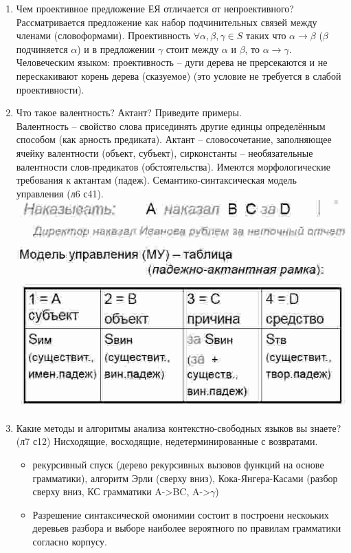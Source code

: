 \documentclass[a4paper]{article}
\begin{document}
\begin{enumerate}
	\item Чем проективное предложение ЕЯ отличается от непроективного?\hfill\\
	Рассматривается предложение как набор подчинительных связей между членами (словоформами). Проективность $\forall \alpha, \beta, \gamma \in S$ таких что $\alpha\to \beta$ ($\beta$ подчиняется $\alpha$) и в предложении $\gamma$ стоит между $\alpha$ и $\beta$, то $\alpha\to\gamma$. Человеческим языком: проективность -- дуги дерева не прерсекаются и не перескакивают корень дерева (сказуемое) (это условие не требуется в слабой проективности).

	\item Что такое валентность? Актант? Приведите примеры.\hfill\\
	Валентность -- свойство слова присединять другие единцы определённым способом (как арность предиката). Актант -- словосочетание, заполняющее ячейку валентности (объект, субъект), сирконстанты -- необязательные валентности слов-предикатов (обстоятельства). Имеются морфологические требования к актантам (падеж). Семантико-синтаксическая модель управления (л6 с41).\hfill\\
	\includegraphics[scale=0.5]{valency}

	\item Какие методы и алгоритмы анализа контекстно-свободных языков вы знаете?\hfill\\
	(л7 с12) Нисходящие, восходящие, недетерминированные с возвратами. \begin{itemize}
		\item рекурсивный спуск (дерево рекурсивных вызовов функций на основе грамматики), алгоритм Эрли (сверху вниз), Кока-Янгера-Касами (разбор сверху вниз, КС грамматики A->BC, A->$\gamma$)
		\item Разрешение синтаксической омонимии состоит в построени нескоьких деревьев разбора и выборе наиболее вероятного по правилам грамматики согласно корпусу.
	\end{itemize}


\end{enumerate}
\end{document}
